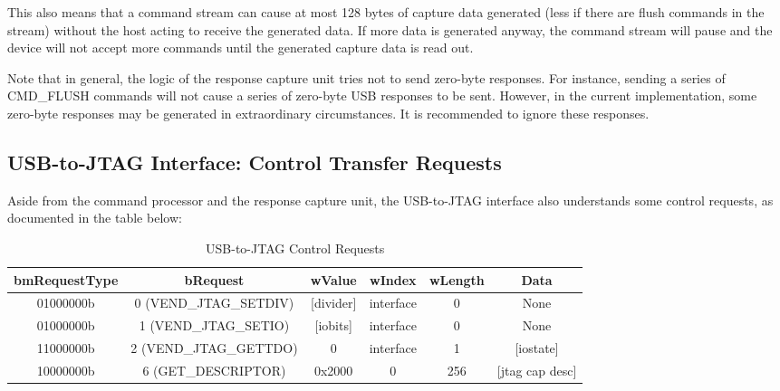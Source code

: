 \documentclass[main\_\_EN.tex]{subfiles}
\begin{document}
This also means that a command stream can cause at most 128 bytes of capture data generated (less if there are flush commands in the stream) without the host acting to receive the generated data. If more data is generated anyway, the command stream will pause and the device will not accept more commands until the generated capture data is read out.

Note that in general, the logic of the response capture unit tries not to send zero-byte responses. For instance, sending a series of CMD\_FLUSH commands will not cause a series of zero-byte USB responses to be sent. However, in the current implementation, some zero-byte responses may be generated in extraordinary circumstances. It is recommended to ignore these responses.

\subsection{USB-to-JTAG Interface: Control Transfer Requests}

Aside from the command processor and the response capture unit, the USB-to-JTAG interface also understands some control requests, as documented in the table below:

\begin{table}[H]
    \centering
    \caption{USB-to-JTAG Control Requests}
    \label{tab:usbserialjtag-control-requests}
    \begin{tabular}{|c|c|c|c|c|c|}
    \hline
       \rowcolor{lightgray}
       \textbf{bmRequestType} & \textbf{bRequest} & \textbf{wValue} & \textbf{wIndex} & \textbf{wLength} & \textbf{Data} \\\hline

       01000000b &  0 (VEND\_JTAG\_SETDIV) & [divider] & interface & 0 &  None \\\hline
       01000000b &  1 (VEND\_JTAG\_SETIO) &  [iobits] &  interface & 0 &   None \\\hline
       11000000b &  2 (VEND\_JTAG\_GETTDO) & 0 & interface & 1 & [iostate] \\\hline
       10000000b &  6 (GET\_DESCRIPTOR) &   0x2000 &  0 &  256 & [jtag cap desc] \\\hline
    \end{tabular}
\end{table}
\end{document}
